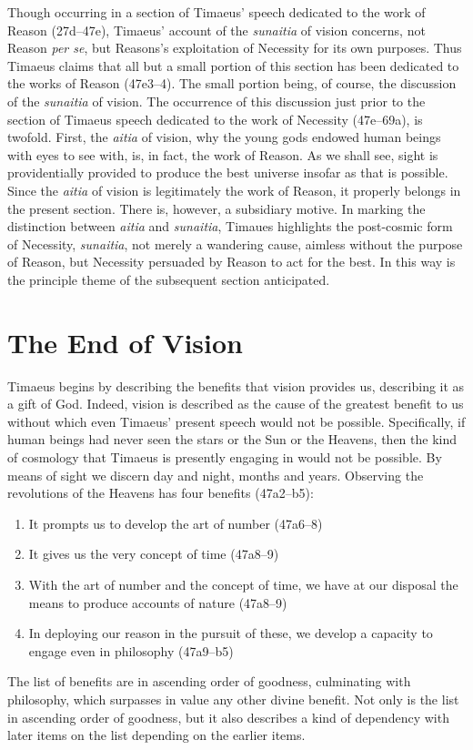 Though occurring in a section of Timaeus' speech dedicated to the work of Reason (27d--47e), Timaeus' account of the \emph{sunaitia} of vision concerns, not Reason \emph{per se}, but Reasons's exploitation of Necessity for its own purposes. Thus Timaeus claims that all but a small portion of this section has been dedicated to the works of Reason (47e3--4). The small portion being, of course, the discussion of the \emph{sunaitia} of vision. The occurrence of this discussion just prior to the section of Timaeus speech dedicated to the work of Necessity (47e--69a), is twofold. First, the \emph{aitia} of vision, why the young gods endowed human beings with eyes to see with, is, in fact, the work of Reason. As we shall see, sight is providentially provided to produce the best universe insofar as that is possible. Since the \emph{aitia} of vision is legitimately the work of Reason, it properly belongs in the present section. There is, however, a subsidiary motive. In marking the distinction between \emph{aitia} and \emph{sunaitia}, Timaues highlights the post-cosmic form of Necessity, \emph{sunaitia}, not merely a wandering cause, aimless without the purpose of Reason, but Necessity persuaded by Reason to act for the best. In this way is the principle theme of the subsequent section anticipated.


\section{The End of Vision} %
\label{sec:the_end_of_sight}

Timaeus begins by describing the benefits that vision provides us, describing it as a gift of God. Indeed, vision is described as the cause of the greatest benefit to us without which even Timaeus' present speech would not be possible. Specifically, if human beings had never seen the stars or the Sun or the Heavens, then the kind of cosmology that Timaeus is presently engaging in would not be possible. By means of sight we discern day and night, months and years. Observing the revolutions of the Heavens has four benefits (47a2--b5):
\begin{enumerate}[(1)]
	\item It prompts us to develop the art of number (47a6--8)
	\item It gives us the very concept of time (47a8--9)
	\item With the art of number and the concept of time, we have at our disposal the means to produce accounts of nature (47a8--9)
	\item In deploying our reason in the pursuit of these, we develop a capacity to engage even in philosophy (47a9--b5)
\end{enumerate}
The list of benefits are in ascending order of goodness, culminating with philosophy, which surpasses in value any other divine benefit. Not only is the list in ascending order of goodness, but it also describes a kind of dependency with later items on the list depending on the earlier items.

